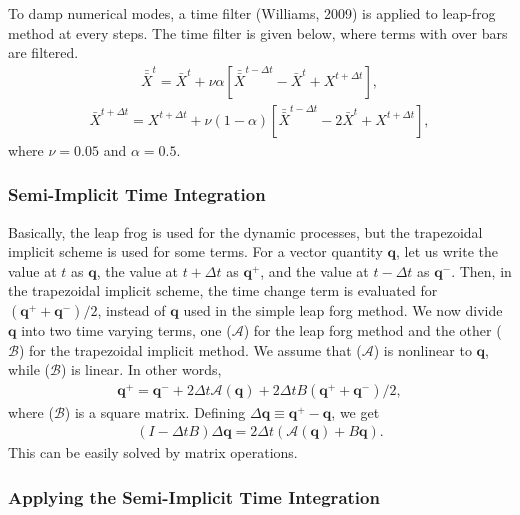 To damp numerical modes, a time filter (Williams, 2009) is applied to
leap-frog method at every steps.
The time filter is given below, where terms with over bars are filtered.
\begin{eqnarray}
\bar{\bar{X}}^{t} = \bar{X}^{t} + \nu \alpha [\bar{\bar{X}}^{t-\Delta t} - \bar{X}^{t} + X^{t+\Delta t}],
\end{eqnarray} \begin{eqnarray}
\bar{X}^{t+\Delta t} = X^{t+\Delta t} + \nu (1-\alpha) [\bar{\bar{X}}^{t-\Delta t} - 2 \bar{X}^{t} + X^{t+\Delta t}],
\end{eqnarray}
where \(\nu=0.05\) and \(\alpha=0.5\).

\hypertarget{semi-implicit-time-integration}{%
\subsubsection{Semi-Implicit Time
Integration}\label{semi-implicit-time-integration}}

Basically, the leap frog is used for the dynamic processes, but the
trapezoidal implicit scheme is used for some terms. For a vector
quantity \({\mathbf q}\), let us write the value at \(t\) as
\({\mathbf q}\), the value at \(t+\Delta t\) as \({\mathbf q}^+\), and
the value at \(t-\Delta t\) as \({\mathbf q}^-\). Then, in the
trapezoidal implicit scheme, the time change term is evaluated for
\(({\mathbf q}^+ + {\mathbf q}^- )/2\), instead of \({\mathbf q}\) used
in the simple leap forg method. We now divide \({\mathbf q}\) into two
time varying terms, one (\({\mathcal A}\)) for the leap forg method and
the other (\({\mathcal B}\)) for the trapezoidal implicit method. We
assume that (\({\mathcal A}\)) is nonlinear to \({\mathbf q}\), while
(\({\mathcal B}\)) is linear. In other words,
\begin{eqnarray}
  {\mathbf q}^+
      = {\mathbf q}^-
      + 2 \Delta t {\mathcal A}( {\mathbf q}  )
      + 2 \Delta t B (   {\mathbf q}^+
                       + {\mathbf q}^-   )/2,
\end{eqnarray}
where (\({\mathcal B}\)) is a square matrix. Defining
\(\Delta {\mathbf q} \equiv {\mathbf q}^+ - {\mathbf q}\), we get
\begin{eqnarray}
  ( I - \Delta t B ) \Delta {\mathbf q}
      = 2 \Delta t \left( {\mathcal A}({\mathbf q})
                         + B {\mathbf q} \right).
\end{eqnarray}
This can be easily solved by matrix operations.

\hypertarget{applying-the-semi-implicit-time-integration}{%
\subsubsection{Applying the Semi-Implicit Time
Integration}\label{applying-the-semi-implicit-time-integration}}

